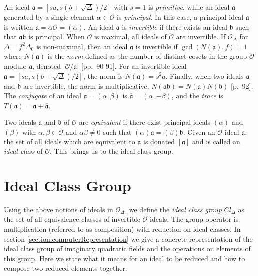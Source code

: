 \documentclass{ucalgthes1}
\theoremstyle{plain}
\theoremstyle{definition}
\newcommand{\OO}{\mathcal{O}}
\begin{document}
An ideal $\mathfrak{a} = [sa, s(b+\sqrt{\Delta})/2]$ with $s=1$ is \emph{primitive}, while an ideal $\mathfrak{a}$ generated by a single element $\alpha \in \OO$ is \emph{principal}. In this case, a principal ideal $\mathfrak a$ is written $\mathfrak{a} = \alpha \OO = (\alpha)$.  An ideal $\mathfrak{a}$ is \emph{invertible} if there exists an ideal $\mathfrak{b}$ such that $\mathfrak{a}\mathfrak{b}$ is principal.  When $\OO$ is maximal, all ideals of $\OO$ are invertible.  If $\OO_\Delta$ for $\Delta = f^2\Delta_0$ is non-maximal, then an ideal $\mathfrak{a}$ is invertible if $\gcd(N(\mathfrak{a}),f)=1$ where $N(\mathfrak{a})$ is the \emph{norm} defined as the number of distinct cosets in the group $\OO$ modulo $\mathfrak{a}$, denoted $|\OO/\mathfrak{a}|$ \cite{Jac09}[pp.~90-91].  For an invertible ideal $\mathfrak{a} = [sa, s(b+\sqrt{\Delta})/2]$, the norm is $N(\mathfrak{a}) = s^2a$.  Finally, when two ideals $\mathfrak{a}$ and $\mathfrak{b}$ are invertible, the norm is multiplicative, $N(\mathfrak{a}\mathfrak{b}) = N(\mathfrak{a})N(\mathfrak{b})$ \cite{Jac09}[p.~92].  The \emph{conjugate} of an ideal $\mathfrak{a} = (\alpha, \beta)$ is $\overline{\mathfrak{a}} = (\alpha, -\beta)$, and the \emph{trace} is $T(\mathfrak a) = \mathfrak a + \overline{\mathfrak a}$.

Two ideals $\mathfrak{a}$ and $\mathfrak{b}$ of $\OO$ are \emph{equivalent} if there exist principal ideals $(\alpha)$ and $(\beta)$ with  $\alpha, \beta \in \OO$ and $\alpha\beta \neq 0$ such that $(\alpha)\mathfrak{a} = (\beta)\mathfrak{b}$.  Given an $\OO$-ideal $\mathfrak{a}$, the set of all ideals which are equivalent to $\mathfrak{a}$ is donated $[\mathfrak{a}]$ and is called an \emph{ideal class} of $\OO$.  This brings us to the ideal class group.


\bigbreak
\section{Ideal Class Group}

Using the above notions of ideals in $\OO_\Delta$, we define the \emph{ideal class group} $Cl_\Delta$ as the set of all equivalence classes of invertible $\OO$-ideals. The group operator is multiplication (referred to as composition) with reduction on ideal classes.  In section \ref{section:computerRepresentation} we give a concrete representation of the ideal class group of imaginary quadratic fields and the operations on elements of this group.  Here we state what it means for an ideal to be reduced and how to compose two reduced elements together.
\end{document}
